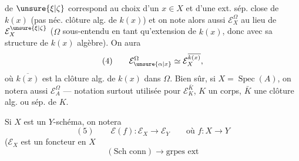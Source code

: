 de $\unsure{\xi|\zeta}$ correspond au choix d'un $x\in X$ et d'une ext. sép. close  \inserted{$\Omega$} de $k(x)$ (pas néc.  clôture alg. de $k(x)$) et on note alors aussi $\mathcal E_X^\Omega$ au lieu de $\mathcal E_X^{\unsure{\xi|\zeta}}$ ($\Omega$ sous-entendu en tant qu'extension de $k(x)$, donc avec sa structure de $k(x)$ algèbre). On aura 
\[
(4)\qquad \mathcal E_{\unsure{\alpha|x}}^\Omega\simeq\mathcal E_X^{\overline{k(x)}},
\]
où $\overline{k(x)}$ est la clôture alg. de $k(x)$ dans $\Omega$. Bien sûr, si $X=\operatorname{Spec}(A)$, on notera aussi $\mathcal E_A^\Omega$ --- notation surtout utilisée pour $\mathcal E_K^{\bar K}$, $K$ un corps, $\bar K$ une clôture alg. ou sép. de $K$.

Si $X$ est un $Y$-schéma,  on notera
\[
(5)\qquad \mathcal E(f):\mathcal E_X\longrightarrow\mathcal E_Y\qquad\text{où }f:X\longrightarrow Y
\]
($\mathcal E_X$ est un foncteur en $X$
\[
(\text{Sch conn})\longrightarrow\text{grpes ext}
\]
